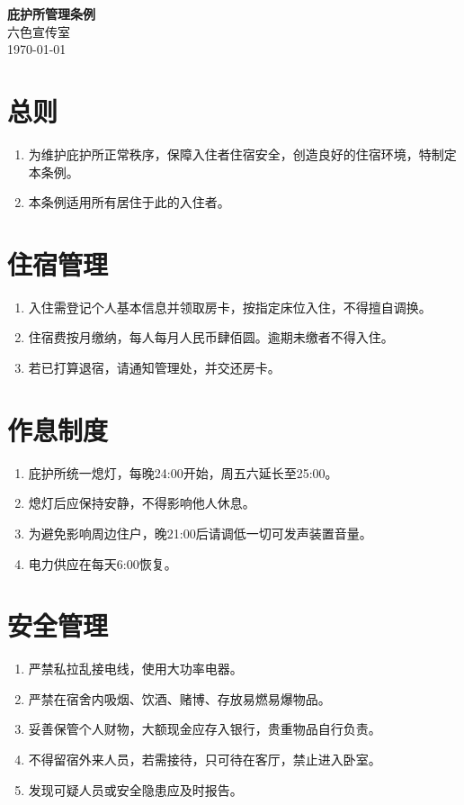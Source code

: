 \documentclass[12pt]{article}
\begin{document}
\allsectionsfont{\sffamily}
\begin{center}
	\huge\textsf{\textbf{庇护所管理条例}}\\
	\vspace{0.5cm}
	\normalsize 六色宣传室\\
	\vspace{0.25cm}
	\today
\end{center}

\section{总则}
\begin{enumerate}
    \item 为维护庇护所正常秩序，保障入住者住宿安全，创造良好的住宿环境，特制定本条例。
    \item 本条例适用所有居住于此的入住者。
\end{enumerate}

\section{住宿管理}
\begin{enumerate}
	\item 入住需登记个人基本信息并领取房卡，按指定床位入住，不得擅自调换。
	\item 住宿费按月缴纳，每人每月人民币肆佰圆。逾期未缴者不得入住。
	\item 若已打算退宿，请通知管理处，并交还房卡。
\end{enumerate}

\section{作息制度}
\begin{enumerate}
	\item 庇护所统一熄灯，每晚24:00开始，周五六延长至25:00。
	\item 熄灯后应保持安静，不得影响他人休息。
	\item 为避免影响周边住户，晚21:00后请调低一切可发声装置音量。
	\item 电力供应在每天6:00恢复。
\end{enumerate}

\section{安全管理}
\begin{enumerate}
	\item 严禁私拉乱接电线，使用大功率电器。
	\item 严禁在宿舍内吸烟、饮酒、赌博、存放易燃易爆物品。
	\item 妥善保管个人财物，大额现金应存入银行，贵重物品自行负责。
	\item 不得留宿外来人员，若需接待，只可待在客厅，禁止进入卧室。
	\item 发现可疑人员或安全隐患应及时报告。
\end{enumerate}
\end{document}
